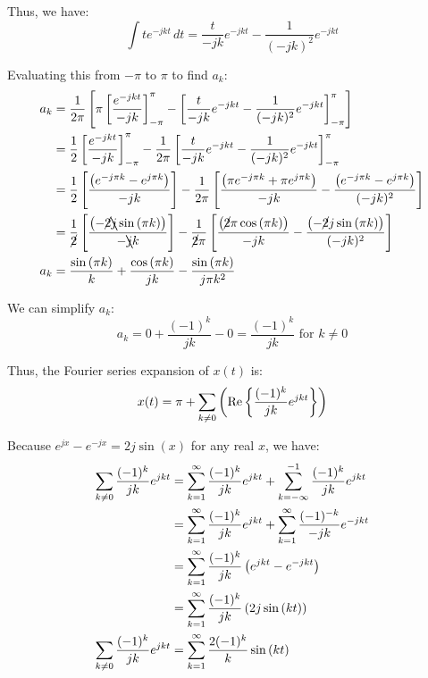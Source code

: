 \documentclass[a4paper, 10pt]{article}
\begin{document}
\begin{tosubmit}
Thus, we have:
\[ \int t e^{-j k t} \,dt = \frac{t}{-j k} e^{-j k t} - \frac{1}{(-j k)^2} e^{-j k t} \]


Evaluating this from \( -\pi \) to \( \pi \) to find \( a_k \):
\begin{align*}
    a_k &= \frac{1}{2\pi} \left[ \pi \left[ \frac{e^{-j k t}}{-j k} \right]_{-\pi}^{\pi} - \left[ \frac{t}{-j k} e^{-j k t} - \frac{1}{(-j k)^2} e^{-j k t} \right]_{-\pi}^{\pi} \right] \\
    &= \frac{1}{2} \left[ \frac{e^{-j k t}}{-j k} \right]_{-\pi}^{\pi} - \frac{1}{2\pi} \left[ \frac{t}{-j k} e^{-j k t} - \frac{1}{(-j k)^2} e^{-j k t} \right]_{-\pi}^{\pi} \\
    &= \frac{1}{2} \left[ \frac{ \left( e^{-j \pi k} - e^{j \pi k} \right) }{-j k} \right] - \frac{1}{2\pi} \left[ \frac{ \left( \pi e^{-j \pi k} + \pi e^{j \pi k} \right) }{-j k} - \frac{ \left( e^{-j \pi k} - e^{j \pi k} \right) }{(-j k)^2} \right] \\
    &= \frac{1}{\cancel{2}} \left[ \frac{ \left( -\cancel{2} \bcancel{j} \sin{(\pi k)} \right) }{- \bcancel{j} k} \right] - \frac{1}{\cancel{2}\pi} \left[ \frac{ \left( \cancel{2}\pi \cos{(\pi k)} \right) }{-j k} - \frac{ \left( -\cancel{2}j\sin{(\pi k)} \right) }{(-j k)^2} \right] \\
    a_k &= \frac{ \sin{(\pi k)} }{k} + \frac{ \cos{(\pi k)} }{jk} - \frac{ \sin{(\pi k)} }{j\pi k^2}
\end{align*}

We can simplify \( a_k \):
\[
a_k = 0 + \frac{ (-1)^k }{jk} - 0 = \frac{ (-1)^k }{jk} \text{ for } k \neq 0
\]

Thus, the Fourier series expansion of \( x(t) \) is:
\[ x(t) = \pi + \sum_{k \neq 0} \left( \text{Re} \left\{ \frac{(-1)^k}{jk} e^{j k t} \right\} \right) \]

Because \( e^{jx} - e^{-jx} = 2j\sin{(x)} \) for any real \( x \), we have:
\begin{align*}
    \sum_{k \neq 0} \frac{(-1)^k}{jk} e^{j k t} &= \sum_{k=1}^{\infty} \frac{(-1)^k}{jk} e^{j k t} + \sum_{k=-\infty}^{-1} \frac{(-1)^k}{jk} e^{j k t} \\
    &= \sum_{k=1}^{\infty} \frac{(-1)^k}{jk} e^{j k t} + \sum_{k=1}^{\infty} \frac{(-1)^{-k}}{-jk} e^{-j k t} \\
    &= \sum_{k=1}^{\infty} \frac{(-1)^k}{jk} \left( e^{j k t} - e^{-j k t} \right) \\
    &= \sum_{k=1}^{\infty} \frac{(-1)^k}{jk} \left( 2j\sin{(k t)} \right) \\
    \sum_{k \neq 0} \frac{(-1)^k}{jk} e^{j k t} &= \sum_{k=1}^{\infty} \frac{2(-1)^k}{k} \sin{(k t)}
\end{align*}


\end{tosubmit}
\end{document}

